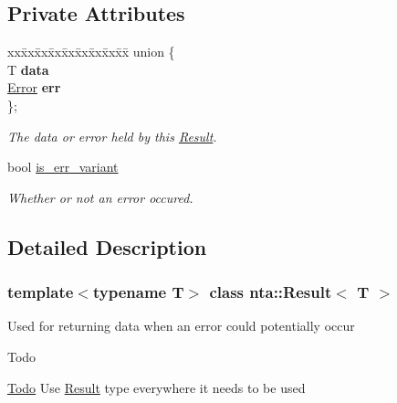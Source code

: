 \subsection*{Private Attributes}
\begin{DoxyCompactItemize}
\item 
\mbox{\label{classnta_1_1Result_a225adf68d093d584826f4aab98cacf97}} 
\begin{tabbing}
xx\=xx\=xx\=xx\=xx\=xx\=xx\=xx\=xx\=\kill
union \{\\
\mbox{\label{classnta_1_1Result_ab084104dfedebe7715d97987595ad147}} 
T {\bfseries data}\\
\mbox{\label{classnta_1_1Result_acd60a522df7b4adf81729de1dc626955}} 
\hyperlink{structnta_1_1Error}{Error} {\bfseries err}\\
\}; \\

\end{tabbing}\begin{DoxyCompactList}\small\item\em The data or error held by this \hyperlink{classnta_1_1Result}{Result}. \end{DoxyCompactList}\item 
\mbox{\label{classnta_1_1Result_a27f85dc35976426c1f5c01431ac2e1cc}} 
bool \hyperlink{classnta_1_1Result_a27f85dc35976426c1f5c01431ac2e1cc}{is\+\_\+err\+\_\+variant}
\begin{DoxyCompactList}\small\item\em Whether or not an error occured. \end{DoxyCompactList}\end{DoxyCompactItemize}


\subsection{Detailed Description}
\subsubsection*{template$<$typename T$>$\newline
class nta\+::\+Result$<$ T $>$}

Used for returning data when an error could potentially occur \begin{DoxyRefDesc}{Todo}
\item[\hyperlink{todo__todo000003}{Todo}]Use \hyperlink{classnta_1_1Result}{Result} type everywhere it needs to be used \end{DoxyRefDesc}


